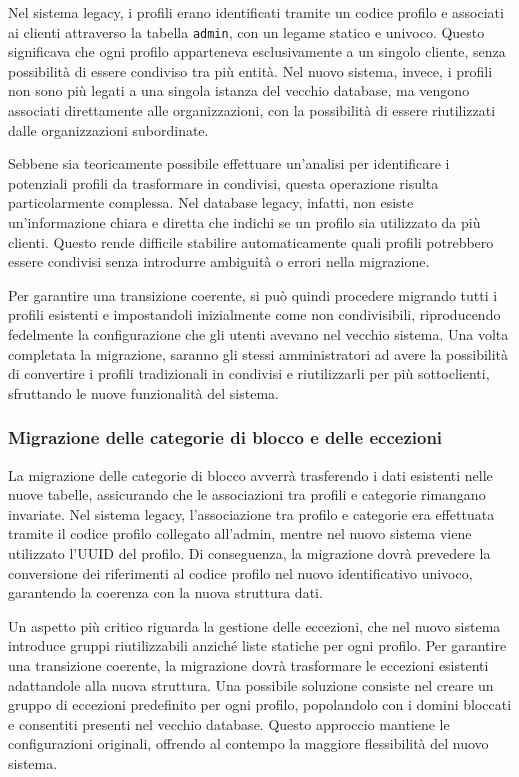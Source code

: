 Nel sistema legacy, i profili erano identificati tramite un codice profilo e associati ai clienti attraverso la tabella \texttt{admin}, con un legame statico e univoco. Questo significava che ogni profilo apparteneva esclusivamente a un singolo cliente, senza possibilità di essere condiviso tra più entità. Nel nuovo sistema, invece, i profili non sono più legati a una singola istanza del vecchio database, ma vengono associati direttamente alle organizzazioni, con la possibilità di essere riutilizzati dalle organizzazioni subordinate.

Sebbene sia teoricamente possibile effettuare un'analisi per identificare i potenziali profili da trasformare in condivisi, questa operazione risulta particolarmente complessa. Nel database legacy, infatti, non esiste un'informazione chiara e diretta che indichi se un profilo sia utilizzato da più clienti. Questo rende difficile stabilire automaticamente quali profili potrebbero essere condivisi senza introdurre ambiguità o errori nella migrazione.

Per garantire una transizione coerente, si può quindi procedere migrando tutti i profili esistenti e impostandoli inizialmente come non condivisibili, riproducendo fedelmente la configurazione che gli utenti avevano nel vecchio sistema. Una volta completata la migrazione, saranno gli stessi amministratori ad avere la possibilità di convertire i profili tradizionali in condivisi e riutilizzarli per più sottoclienti, sfruttando le nuove funzionalità del sistema.

\subsubsection{Migrazione delle categorie di blocco e delle eccezioni}
La migrazione delle categorie di blocco avverrà trasferendo i dati esistenti nelle nuove tabelle, assicurando che le associazioni tra profili e categorie rimangano invariate. Nel sistema legacy, l'associazione tra profilo e categorie era effettuata tramite il codice profilo collegato all'admin, mentre nel nuovo sistema viene utilizzato l'UUID del profilo. Di conseguenza, la migrazione dovrà prevedere la conversione dei riferimenti al codice profilo nel nuovo identificativo univoco, garantendo la coerenza con la nuova struttura dati.

Un aspetto più critico riguarda la gestione delle eccezioni, che nel nuovo sistema introduce gruppi riutilizzabili anziché liste statiche per ogni profilo. Per garantire una transizione coerente, la migrazione dovrà trasformare le eccezioni esistenti adattandole alla nuova struttura. Una possibile soluzione consiste nel creare un gruppo di eccezioni predefinito per ogni profilo, popolandolo con i domini bloccati e consentiti presenti nel vecchio database. Questo approccio mantiene le configurazioni originali, offrendo al contempo la maggiore flessibilità del nuovo sistema.

